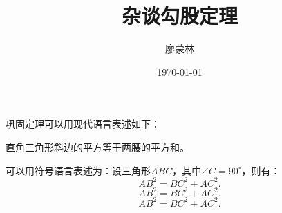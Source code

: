 \documentclass[fontset=windows]{ctexart}
\title{\heiti 杂谈勾股定理}
\author{\kaishu 廖蒙林}
\date{\today}
\newcommand\degree{^\circ}
\begin{document}
    \maketitle

    巩固定理可以用现代语言表述如下：

    直角三角形斜边的平方等于两腰的平方和。

    可以用符号语言表述为：设三角形$ABC$，其中$\angle C=90\degree$，则有：
    \begin{equation}
        AB^2 = BC^2 + AC^2.
    \end{equation}
    \begin{equation}
        AB^2 = BC^2 + AC^2.
    \end{equation}
    $$AB^2 = BC^2 + AC^2.$$
\end{document}
